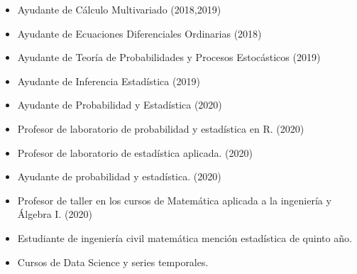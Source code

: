 \documentclass[10pt,letterpaper,ragged2e]{altacv}
\begin{document}
\begin{paracol}{2}


\begin{itemize}
\item Ayudante de Cálculo Multivariado (2018,2019)
\item Ayudante de Ecuaciones Diferenciales Ordinarias (2018)
\item Ayudante de Teoría de Probabilidades y Procesos Estocásticos (2019)
\item Ayudante de Inferencia Estadística (2019)
\item Ayudante de Probabilidad y Estadística (2020)
\end{itemize}
\divider
{}
\begin{itemize}
\item Profesor de laboratorio de probabilidad y estadística en R. (2020)
\item Profesor de laboratorio de estadística aplicada. (2020)
\item Ayudante de probabilidad y estadística. (2020)
\end{itemize}
\divider
{}
\begin{itemize}
\item Profesor de taller en los cursos de Matemática aplicada a la ingeniería y Álgebra I. (2020)
\end{itemize}






\begin{itemize}
\item Estudiante de ingeniería civil matemática mención estadística de quinto año.
\end{itemize}
\divider

\begin{itemize}
\item Cursos de Data Science y series temporales.
\end{itemize}
\divider
\switchcolumn


\end{paracol}
\end{document}
